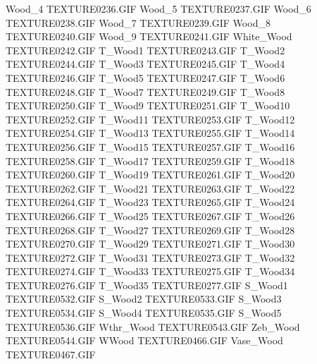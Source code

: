 Wood_4                         TEXTURE\TEX0236.GIF
Wood_5                         TEXTURE\TEX0237.GIF
Wood_6                         TEXTURE\TEX0238.GIF
Wood_7                         TEXTURE\TEX0239.GIF
Wood_8                         TEXTURE\TEX0240.GIF
Wood_9                         TEXTURE\TEX0241.GIF
White_Wood                     TEXTURE\TEX0242.GIF
T_Wood1                        TEXTURE\TEX0243.GIF
T_Wood2                        TEXTURE\TEX0244.GIF
T_Wood3                        TEXTURE\TEX0245.GIF
T_Wood4                        TEXTURE\TEX0246.GIF
T_Wood5                        TEXTURE\TEX0247.GIF
T_Wood6                        TEXTURE\TEX0248.GIF
T_Wood7                        TEXTURE\TEX0249.GIF
T_Wood8                        TEXTURE\TEX0250.GIF
T_Wood9                        TEXTURE\TEX0251.GIF
T_Wood10                       TEXTURE\TEX0252.GIF
T_Wood11                       TEXTURE\TEX0253.GIF
T_Wood12                       TEXTURE\TEX0254.GIF
T_Wood13                       TEXTURE\TEX0255.GIF
T_Wood14                       TEXTURE\TEX0256.GIF
T_Wood15                       TEXTURE\TEX0257.GIF
T_Wood16                       TEXTURE\TEX0258.GIF
T_Wood17                       TEXTURE\TEX0259.GIF
T_Wood18                       TEXTURE\TEX0260.GIF
T_Wood19                       TEXTURE\TEX0261.GIF
T_Wood20                       TEXTURE\TEX0262.GIF
T_Wood21                       TEXTURE\TEX0263.GIF
T_Wood22                       TEXTURE\TEX0264.GIF
T_Wood23                       TEXTURE\TEX0265.GIF
T_Wood24                       TEXTURE\TEX0266.GIF
T_Wood25                       TEXTURE\TEX0267.GIF
T_Wood26                       TEXTURE\TEX0268.GIF
T_Wood27                       TEXTURE\TEX0269.GIF
T_Wood28                       TEXTURE\TEX0270.GIF
T_Wood29                       TEXTURE\TEX0271.GIF
T_Wood30                       TEXTURE\TEX0272.GIF
T_Wood31                       TEXTURE\TEX0273.GIF
T_Wood32                       TEXTURE\TEX0274.GIF
T_Wood33                       TEXTURE\TEX0275.GIF
T_Wood34                       TEXTURE\TEX0276.GIF
T_Wood35                       TEXTURE\TEX0277.GIF
S_Wood1                        TEXTURE\TEX0532.GIF
S_Wood2                        TEXTURE\TEX0533.GIF
S_Wood3                        TEXTURE\TEX0534.GIF
S_Wood4                        TEXTURE\TEX0535.GIF
S_Wood5                        TEXTURE\TEX0536.GIF
Wthr_Wood                      TEXTURE\TEX0543.GIF
Zeb_Wood                       TEXTURE\TEX0544.GIF
WWood                          TEXTURE\TEX0466.GIF
Vase_Wood                      TEXTURE\TEX0467.GIF
